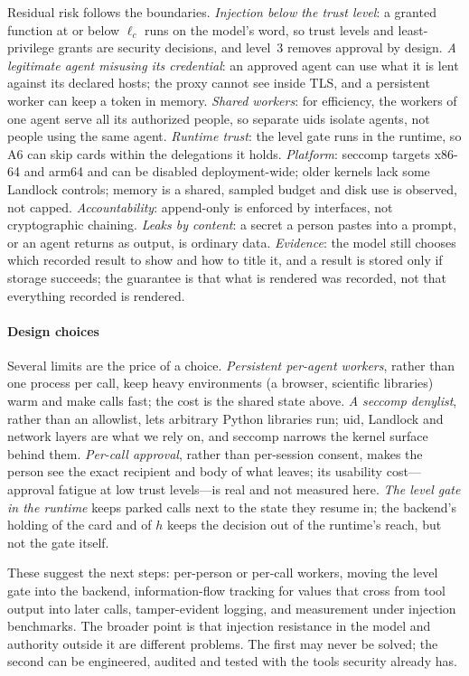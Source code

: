 \documentclass[10pt,twocolumn,a4paper]{article}
\begin{document}
Residual risk follows the boundaries. \emph{Injection below the trust
level}: a granted function at or below $\ell_c$ runs on the model's
word, so trust levels and least-privilege grants are security
decisions, and level~3 removes approval by design. \emph{A legitimate
agent misusing its credential}: an approved agent can use what it is
lent against its declared hosts; the proxy cannot see inside TLS, and
a persistent worker can keep a token in memory. \emph{Shared workers}:
for efficiency, the workers of one agent serve all its authorized
people, so separate uids isolate agents, not people using the same
agent. \emph{Runtime trust}: the level gate runs in the runtime, so
A6 can skip cards within the delegations it holds. \emph{Platform}:
seccomp targets x86-64 and arm64 and can be disabled deployment-wide;
older kernels lack some Landlock controls; memory is a shared, sampled
budget and disk use is observed, not capped. \emph{Accountability}:
append-only is enforced by interfaces, not cryptographic chaining.
\emph{Leaks by content}: a secret a person pastes into a prompt, or an
agent returns as output, is ordinary data. \emph{Evidence}: the model
still chooses which recorded result to show and how to title it, and a
result is stored only if storage succeeds; the guarantee is that what
is rendered was recorded, not that everything recorded is rendered.

\paragraph{Design choices}
Several limits are the price of a choice. \emph{Persistent per-agent
workers}, rather than one process per call, keep heavy environments
(a browser, scientific libraries) warm and make calls fast; the cost is
the shared state above. \emph{A seccomp denylist}, rather than an
allowlist, lets arbitrary Python libraries run; uid, Landlock and
network layers are what we rely on, and seccomp narrows the kernel
surface behind them. \emph{Per-call approval}, rather than per-session
consent, makes the person see the exact recipient and body of what
leaves; its usability cost---approval fatigue at low trust
levels---is real and not measured here. \emph{The level gate in the
runtime} keeps parked calls next to the state they resume in; the
backend's holding of the card and of $h$ keeps the decision out of the
runtime's reach, but not the gate itself.

These suggest the next steps: per-person or per-call workers,
moving the level gate into the backend, information-flow tracking for
values that cross from tool output into later calls, tamper-evident
logging, and measurement under injection benchmarks. The broader point
is that injection resistance in the model and authority outside it are
different problems. The first may never be solved; the second can be
engineered, audited and tested with the tools security already has.
\end{document}
